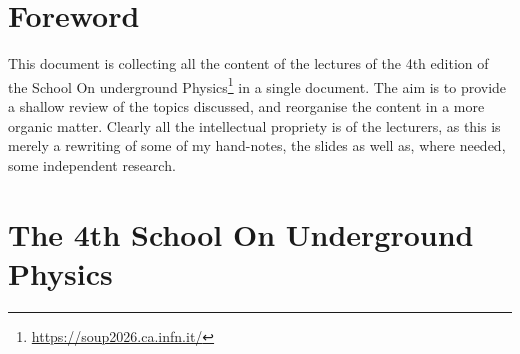 
\section*{Foreword}

This document is collecting all the content of the lectures of the 4th edition of the School On underground Physics\footnote{\url{https://soup2026.ca.infn.it/}} in a single document. The aim is to provide a shallow review of the topics discussed, and reorganise the content in a more organic matter. Clearly all the intellectual propriety is of the lecturers, as this is merely a rewriting of some of my hand-notes, the slides as well as, where needed, some independent research. 

\section*{The 4th School On Underground Physics}



